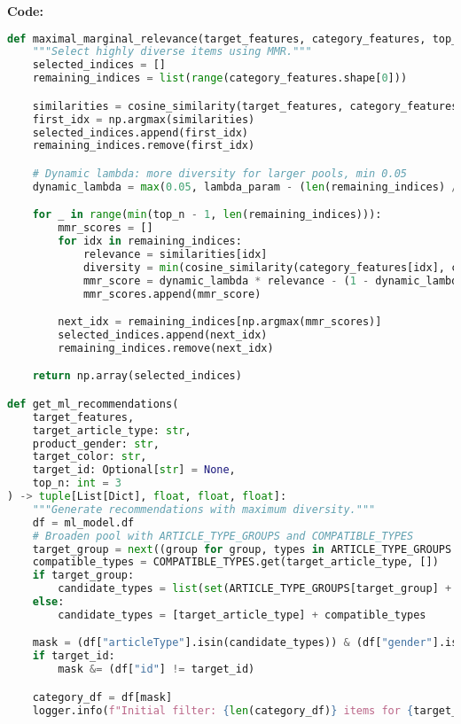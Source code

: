 \documentclass[12pt,a4paper]{article}
\begin{document}
\textbf{Code:}
\begin{lstlisting}[language=Python]
def maximal_marginal_relevance(target_features, category_features, top_n: int, lambda_param: float = 0.1) -> np.ndarray:
    """Select highly diverse items using MMR."""
    selected_indices = []
    remaining_indices = list(range(category_features.shape[0]))

    similarities = cosine_similarity(target_features, category_features).flatten()
    first_idx = np.argmax(similarities)
    selected_indices.append(first_idx)
    remaining_indices.remove(first_idx)

    # Dynamic lambda: more diversity for larger pools, min 0.05
    dynamic_lambda = max(0.05, lambda_param - (len(remaining_indices) / 2000))

    for _ in range(min(top_n - 1, len(remaining_indices))):
        mmr_scores = []
        for idx in remaining_indices:
            relevance = similarities[idx]
            diversity = min(cosine_similarity(category_features[idx], category_features[selected_indices]).flatten())
            mmr_score = dynamic_lambda * relevance - (1 - dynamic_lambda) * diversity
            mmr_scores.append(mmr_score)

        next_idx = remaining_indices[np.argmax(mmr_scores)]
        selected_indices.append(next_idx)
        remaining_indices.remove(next_idx)

    return np.array(selected_indices)

def get_ml_recommendations(
    target_features,
    target_article_type: str,
    product_gender: str,
    target_color: str,
    target_id: Optional[str] = None,
    top_n: int = 3
) -> tuple[List[Dict], float, float, float]:
    """Generate recommendations with maximum diversity."""
    df = ml_model.df
    # Broaden pool with ARTICLE_TYPE_GROUPS and COMPATIBLE_TYPES
    target_group = next((group for group, types in ARTICLE_TYPE_GROUPS.items() if target_article_type in types), None)
    compatible_types = COMPATIBLE_TYPES.get(target_article_type, [])
    if target_group:
        candidate_types = list(set(ARTICLE_TYPE_GROUPS[target_group] + compatible_types))
    else:
        candidate_types = [target_article_type] + compatible_types

    mask = (df["articleType"].isin(candidate_types)) & (df["gender"].isin([product_gender, "Unisex"]))
    if target_id:
        mask &= (df["id"] != target_id)

    category_df = df[mask]
    logger.info(f"Initial filter: {len(category_df)} items for {target_article_type}, gender: {product_gender}")


\end{lstlisting}
\end{document}
